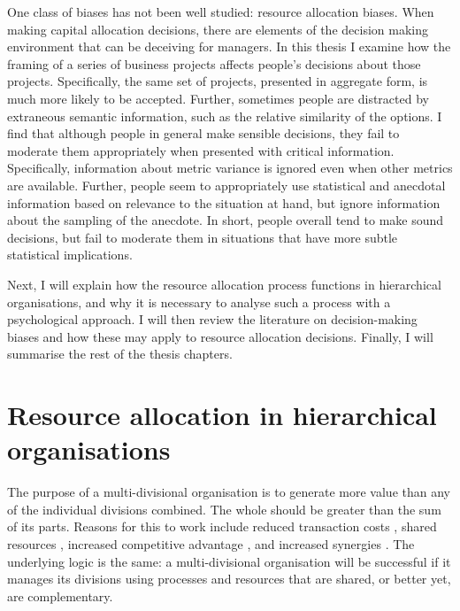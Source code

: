 \documentclass[a4paper, nobind, dvipsnames]{templates/ociamthesis}
\theoremstyle{definition}
\theoremstyle{definition}
\theoremstyle{definition}
\theoremstyle{definition}
\theoremstyle{remark}
\begin{document}
One class of biases has not been well studied: resource allocation biases. When
making capital allocation decisions, there are elements of the decision making
environment that can be deceiving for managers. In this thesis I examine how the
framing of a series of business projects affects people's decisions about those
projects. Specifically, the same set of projects, presented in aggregate form,
is much more likely to be accepted. Further, sometimes people are distracted by
extraneous semantic information, such as the relative similarity of the options.
I find that although people in general make sensible decisions, they fail to
moderate them appropriately when presented with critical information.
Specifically, information about metric variance is ignored even when other
metrics are available. Further, people seem to appropriately use statistical and
anecdotal information based on relevance to the situation at hand, but ignore
information about the sampling of the anecdote. In short, people overall tend to
make sound decisions, but fail to moderate them in situations that have more
subtle statistical implications.

Next, I will explain how the resource allocation process functions in
hierarchical organisations, and why it is necessary to analyse such a process
with a psychological approach. I will then review the literature on
decision-making biases and how these may apply to resource allocation decisions.
Finally, I will summarise the rest of the thesis chapters.

\hypertarget{resource-allocation-in-hierarchical-organisations}{%
\section{Resource allocation in hierarchical organisations}\label{resource-allocation-in-hierarchical-organisations}}

The purpose of a multi-divisional organisation is to generate more value than
any of the individual divisions combined. The whole should be greater than the
sum of its parts. Reasons for this to work include reduced transaction costs
\autocite{williamson1981,teece1982,teece1980,coase1937}, shared resources
\autocite{wernerfelt1984,barney1991}, increased competitive advantage \autocite{porter1998a,porter1998}, and increased synergies \autocite{barney1988}. The underlying logic is the
same: a multi-divisional organisation will be successful if it manages its
divisions using processes and resources that are shared, or better yet, are
complementary.
\end{document}
